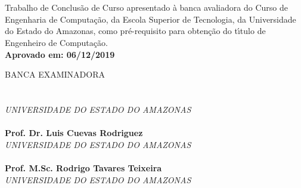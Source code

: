 
\begin{center}
\bf \MakeUppercase{\nome}\\[1.5 cm]
\end{center}

\begin{center}
\bf \MakeUppercase{\titulo}\\[1.5cm]
\end{center}

\hspace*{8cm}
\begin{minipage}{8cm}

Trabalho de Conclus\~{a}o de Curso apresentado \`{a}
banca avaliadora do Curso de Engenharia de Computa\c{c}\~{a}o,
da Escola Superior de Tecnologia, da Universidade do Estado do Amazonas,
como pr\'e-requisito para obten\c{c}\~{a}o do t\'{\i}tulo de
Engenheiro de Computa\c{c}\~{a}o.\\

\large \bf Aprovado em: 06/12/2019
\end{minipage}

BANCA EXAMINADORA\\[12 pt]

\noindent \hrulefill \hspace*{6cm} \\
\noindent \textbf{\orientador}\\
\textit{UNIVERSIDADE DO ESTADO DO AMAZONAS}\\[0.5cm]

\noindent \hrulefill \hspace*{6cm} \\
\noindent \textbf{Prof. Dr. Luis Cuevas Rodriguez}\\
\textit{UNIVERSIDADE DO ESTADO DO AMAZONAS}\\[0.5cm]

\noindent \hrulefill \hspace*{6cm} \\
\noindent \textbf{Prof. M.Sc. Rodrigo Tavares Teixeira}\\
\textit{UNIVERSIDADE DO ESTADO DO AMAZONAS}\\
